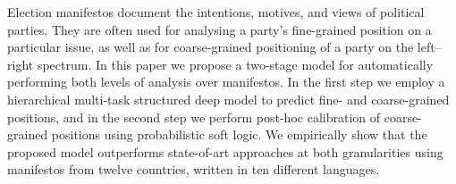 Election manifestos document the intentions, motives, and views of political parties. They are often used for analysing a party's fine-grained position on a particular issue, as well as for coarse-grained positioning of a party on the left--right spectrum. In this paper we propose a two-stage model for automatically performing both levels of analysis over manifestos. In the first step we employ a hierarchical multi-task structured deep model to predict fine- and coarse-grained positions, and in the second step we perform post-hoc calibration of coarse-grained positions using probabilistic soft logic. We empirically show that the proposed model outperforms state-of-art approaches at both granularities using manifestos from twelve countries, written in ten different languages.
